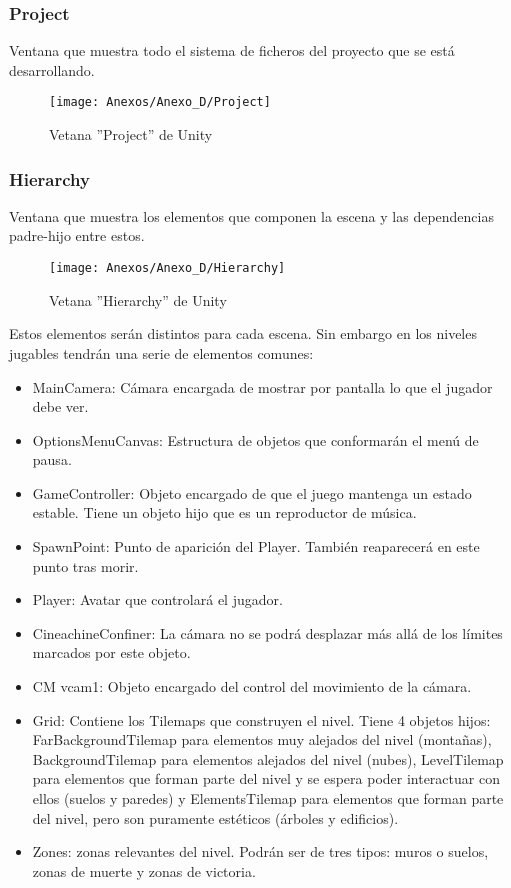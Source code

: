 \subsubsection{Project}
Ventana que muestra todo el sistema de ficheros del proyecto que se está desarrollando.

\begin{figure}[h]
\centering
\texttt{[image: Anexos/Anexo\_D/Project]}
\caption{Vetana ''Project'' de Unity}
\end{figure}
\clearpage

\subsubsection{Hierarchy}
Ventana que muestra los elementos que componen la escena y las dependencias padre-hijo entre estos.

\begin{figure}[h]
\centering
\texttt{[image: Anexos/Anexo\_D/Hierarchy]}
\caption{Vetana ''Hierarchy'' de Unity}
\end{figure}

Estos elementos serán distintos para cada escena. Sin embargo en los niveles jugables tendrán una serie de elementos comunes:
\begin{itemize}
\item
MainCamera: Cámara encargada de mostrar por pantalla lo que el jugador debe ver.
\item
OptionsMenuCanvas: Estructura de objetos que conformarán el menú de pausa.
\item
GameController: Objeto encargado de que el juego mantenga un estado estable. Tiene un objeto hijo que es un reproductor de música.
\item
SpawnPoint: Punto de aparición del Player. También reaparecerá en este punto tras morir.
\item
Player: Avatar que controlará el jugador.
\item
CineachineConfiner: La cámara no se podrá desplazar más allá de los límites marcados por este objeto.
\item
CM vcam1: Objeto encargado del control del movimiento de la cámara.
\item
Grid: Contiene los Tilemaps que construyen el nivel. Tiene 4 objetos hijos: FarBackgroundTilemap para elementos muy alejados del nivel (montañas), BackgroundTilemap para elementos alejados del nivel (nubes), LevelTilemap para elementos que forman parte del nivel y se espera poder interactuar con ellos (suelos y paredes) y ElementsTilemap para elementos que forman parte del nivel, pero son puramente estéticos (árboles y edificios).
\item
Zones: zonas relevantes del nivel. Podrán ser de tres tipos: muros o suelos, zonas de muerte y zonas de victoria.
\end{itemize}

